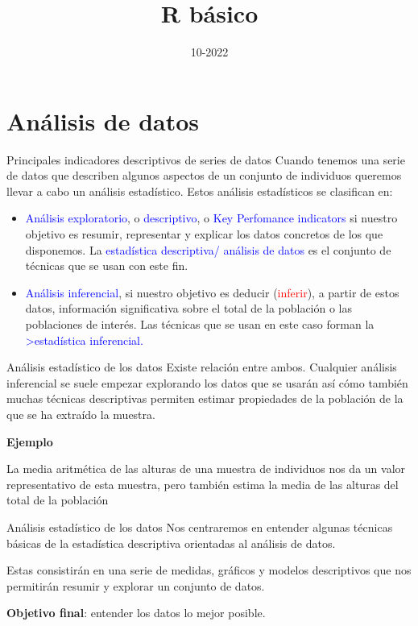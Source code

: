 \documentclass[
  ignorenonframetext,
  aspectratio=169]{beamer}
\title{R básico}
\author{}
\date{\vspace{-2.5em}10-2022}
\newcommand\blue[1]{\textcolor{blue}{#1}}
\newcommand\red[1]{\textcolor{red}{#1}}
\begin{document}
\frame{\titlepage}

\begin{frame}[allowframebreaks]
  \tableofcontents[hideallsubsections]
\end{frame}
\hypertarget{anuxe1lisis-de-datos}{%
\section{Análisis de datos}\label{anuxe1lisis-de-datos}}

\begin{frame}{Principales indicadores descriptivos de series de datos}
\protect\hypertarget{principales-indicadores-descriptivos-de-series-de-datos}{}
Cuando tenemos una serie de datos que describen algunos aspectos de un
conjunto de individuos queremos llevar a cabo un análisis estadístico.
Estos análisis estadísticos se clasifican en:

\begin{itemize}
\item
  \blue{Análisis exploratorio}, o \blue{descriptivo}, o
  \blue{Key Perfomance indicators} si nuestro objetivo es resumir,
  representar y explicar los datos concretos de los que disponemos. La
  \blue{estadística descriptiva/ análisis de datos} es el conjunto de
  técnicas que se usan con este fin.
\item
  \blue{Análisis inferencial}, si nuestro objetivo es deducir
  (\red{inferir}), a partir de estos datos, información significativa
  sobre el total de la población o las poblaciones de interés. Las
  técnicas que se usan en este caso forman la
  \blue{>estadística inferencial.}
\end{itemize}
\end{frame}

\begin{frame}{Análisis estadístico de los datos}
\protect\hypertarget{anuxe1lisis-estaduxedstico-de-los-datos}{}
Existe relación entre ambos. Cualquier análisis inferencial se suele
empezar explorando los datos que se usarán así cómo también muchas
técnicas descriptivas permiten estimar propiedades de la población de la
que se ha extraído la muestra.

\textbf{Ejemplo}

La media aritmética de las alturas de una muestra de individuos nos da
un valor representativo de esta muestra, pero también estima la media de
las alturas del total de la población
\end{frame}

\begin{frame}{Análisis estadístico de los datos}
\protect\hypertarget{anuxe1lisis-estaduxedstico-de-los-datos-1}{}
Nos centraremos en entender algunas técnicas básicas de la estadística
descriptiva orientadas al análisis de datos.

Estas consistirán en una serie de medidas, gráficos y modelos
descriptivos que nos permitirán resumir y explorar un conjunto de datos.

\textbf{Objetivo final}: entender los datos lo mejor posible.
\end{frame}
\end{document}
